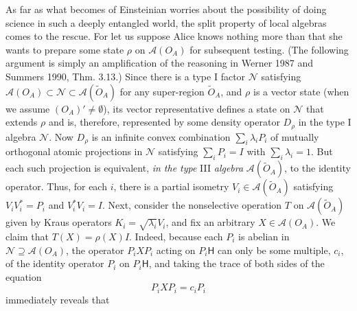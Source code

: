 \documentclass[12pt]{article}
\newcommand{\alg}[1]{\mbox{$\mathcal{#1}$}}
\newcommand{\hil}[1]{\mbox{$\mathsf{#1}$}}
\begin{document}
               As far as what becomes of Einsteinian worries about the possibility of 
                doing science in such a deeply entangled world, the split property of local algebras comes to 
                the rescue.   For let us suppose Alice knows nothing more than 
                that she wants to prepare some 
                state $\rho$ on $\alg{A}(O_{A})$ for subsequent 
                testing.  (The following argument is simply an 
                amplification of 
                the reasoning in Werner 1987 and 
                Summers 1990, Thm. 3.13.)   
                Since there is a type I factor $\alg{N}$ satisfying  
                $\alg{A}(O_{A})\subset 
                \alg{N}\subset\alg{A}(\tilde{O}_{A})$ 
                for any super-region $\tilde{O}_{A}$, and $\rho$ is a 
                vector state (when we assume $(O_{A})'\not=\emptyset$), 
                its vector representative defines a 
                state on $\alg{N}$ that extends $\rho$ and is, therefore, represented by some density 
                operator $D_{\rho}$ in the type I algebra $\alg{N}$.  
                Now
                $D_{\rho}$ is an infinite convex 
                combination $\sum_{i}\lambda_{i}P_{i}$ of mutually orthogonal 
                atomic projections 
                in $\alg{N}$ satisfying $\sum_{i} P_{i}=I$ with $\sum_{i} 
                \lambda_{i}=1$.  But each 
                such projection is equivalent, \emph{in the type} III 
                \emph{algebra} $\alg{A}(\tilde{O}_{A})$, to the 
                identity operator.  
                Thus, 
                for each $i$, there is a partial isometry $V_{i}\in\alg{A}(\tilde{O}_{A})$  
                satisfying $V_{i}V_{i}^{*}=P_{i}$ and 
                $V_{i}^{*}V_{i}=I$.  Next, consider the 
                nonselective operation $T$ on $\alg{A}(\tilde{O}_{A})$ given by 
                Kraus operators $K_{i}=\sqrt{\lambda_{i}}V_{i}$, and 
                fix an arbitrary $X\in\alg{A}(O_{A})$.  We claim that $T(X)=\rho(X)I$.  Indeed, because each 
                $P_{i}$ is abelian in $\alg{N}\supseteq\alg{A}(O_{A})$, the operator $P_{i}XP_{i}$ acting 
                on $P_{i}\hil{H}$ can only be some multiple, $c_{i}$, of the 
                identity operator $P_{i}$ on $P_{i}\hil{H}$, and taking the 
                trace of both sides of the equation
                \begin{equation} \label{eq:this} 
                P_{i}XP_{i}=c_{i}P_{i}
                \end{equation}
                 immediately reveals that 
\end{document}

